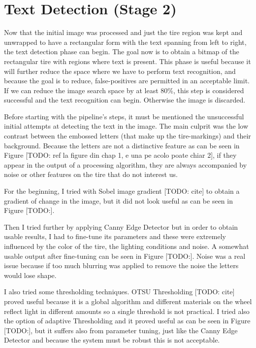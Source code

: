 \section{Text Detection (Stage 2)}\label{sec:text-detection}
Now that the initial image was processed and just the tire region was kept and unwrapped to have a rectangular form with the text spanning from left to right, the text detection phase can begin. The goal now is to obtain a bitmap of the rectangular tire with regions where text is present. This phase is useful because it will further reduce the space where we have to perform text recognition, and because the goal is to reduce, false-positives are permitted in an acceptable limit. If we can reduce the image search space by at least 80\%, this step is considered successful and the text recognition can begin. Otherwise the image is discarded.

Before starting with the pipeline's steps, it must be mentioned the unsuccessful initial attempts at detecting the text in the image. The main culprit was the low contrast between the embossed letters (that make up the tire-markings) and their background. Because the letters are not a distinctive feature as can be seen in Figure [TODO: ref la figure din chap 1, e una pe acolo poate chiar 2], if they appear in the output of a processing algorithm, they are always accompanied by noise or other features on the tire that do not interest us.

For the beginning, I tried with Sobel image gradient [TODO: cite] to obtain a gradient of change in the image, but it did not look useful as can be seen in Figure [TODO:].

Then I tried further by applying Canny Edge Detector \cite{site:Canny_edge_detection} but in order to obtain usable results, I had to fine-tune its parameters and these were extremely influenced by the color of the tire, the lighting conditions and noise. A somewhat usable output after fine-tuning can be seen in Figure [TODO:]. Noise was a real issue because if too much blurring was applied to remove the noise the letters would lose shape.

I also tried some thresholding techniques. OTSU Thresholding [TODO: cite] proved useful because it is a global algorithm and different materials on the wheel reflect light in different amounts so a single threshold is not practical. I tried also the option of adaptive Thresholding and it proved useful as can be seen in Figure [TODO:], but it suffers also from parameter tuning, just like the Canny Edge Detector and because the system must be robust this is not acceptable.

